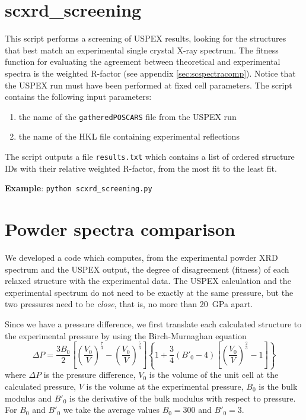 \documentclass{article}
\begin{document}
\section{scxrd\_screening}

This script performs a screening of USPEX results, looking for the structures that best match an experimental single crystal X-ray spectrum. The fitness function for evaluating the agreement between theoretical and experimental spectra is the weighted R-factor (see appendix \ref{sec:scspectracomp}). Notice that the USPEX run must have been performed at fixed cell parameters. The script contains the following input parameters:
\begin{enumerate}
	\item the name of the \texttt{gatheredPOSCARS} file from the USPEX run
	\item the name of the HKL file containing experimental reflections
\end{enumerate}
The script outputs a file \texttt{results.txt} which contains a list of ordered structure IDs with their relative weighted R-factor, from the most fit to the least fit.

\vspace{0.2cm}
\noindent \textbf{Example}: \texttt{python scxrd\_screening.py}

\appendix
\appendixpage

\section{Powder spectra comparison}
\label{sec:powderspectracomp}

We developed a code which computes, from the experimental powder XRD spectrum and the USPEX output, the degree of disagreement (fitness) of each relaxed structure with the experimental data. The USPEX calculation and the experimental spectrum do not need to be exactly at the same pressure, but the two pressures need to be \emph{close}, that is, no more than \SI{20}{GPa} apart.

Since we have a pressure difference, we first translate each calculated structure to the experimental pressure by using the Birch-Murnaghan equation
\begin{equation*}
	\Delta P = \frac{3 B_0}{2} \left[ \left( \frac{V_0}{V} \right)^{\frac{7}{3}} - \left( \frac{V_0}{V} \right)^{\frac{5}{3}} \right] \left\{ 1 + \frac{3}{4} \left( B'_0 - 4 \right) \left[ \left( \frac{V_0}{V} \right)^{\frac{2}{3}} - 1 \right] \right\}
\end{equation*}
where $\Delta P$ is the pressure difference, $V_0$ is the volume of the unit cell at the calculated pressure, $V$ is the volume at the experimental pressure, $B_0$ is the bulk modulus and $B'_0$ is the derivative of the bulk modulus with respect to pressure. For $B_0$ and $B'_0$ we take the average values $B_0 = 300$ and $B'_0 = 3$. 
\end{document}
